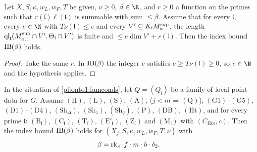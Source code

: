 \begin{lemma}\label{pf:onto1:concl_of_nat}
Let $X,S,\kappa,w_L,w_F,T$ be given, $\nu\ge0$, $\beta\in\R$, and $r\ge0$ a function on the primes such that
$r(\mathfrak l)\ell(\mathfrak l)$ is summable with sum $\le\beta$. Assume that for every $\mathfrak l$, every $e\in\N$ with
$T\nu(\mathfrak l)\le e$ and every $V'\subseteq K_{\mathfrak l}M^{\mathrm{sup}}_\kappa$, the length
$\operatorname{ql}_{\mathfrak l}(M^{\mathrm{sup}}_{\kappa,\mathfrak l}\cap V',\Theta_{\mathfrak l}\cap V')$ is finite and $\le e\dim V'+r(\mathfrak
l)$. Then the index bound $\mathrm{IB}(\beta)$ holds.
\end{lemma}

\begin{proof}
Take the same $r$. In $\mathrm{IB}(\beta)$ the integer $e$ satisfies $e\ge T\nu(\mathfrak l)\ge0$, so $e\in\N$ and the
hypothesis applies.
\end{proof}

\begin{theorem}\label{pf:onto1:thmzero}
In the situation of \cref{pf:onto1:famconds}, let $Q=(Q_{\mathfrak l})$ be a family of local point data for $G$. Assume
$(\mathrm H)$, $(\mathrm L)$, $(\mathrm S)$, $(\mathrm A)$, ($j<m\Rightarrow(\mathrm Q)$), $(\mathrm G1)$--$(\mathrm G5)$, $(\mathrm
D1)$--$(\mathrm D4)$, $(\mathrm{Sh}_\Delta)$, $(\mathrm{Sh}_z)$, $(\mathrm{Sh}_q)$, $(\mathrm P)$, $(\mathrm{DB})$, $(\mathrm{Ht})$, and
for every prime $\mathfrak l$: $(\mathrm B_{\mathfrak l})$, $(\mathrm C_{\mathfrak l})$, $(\mathrm T_{\mathfrak l})$, $(\mathrm E'_{\mathfrak
l})$, $(\mathrm Z_{\mathfrak l})$ and $(\mathrm M_{\mathfrak l})$ with $(C_{Rm},c)$. Then the index bound $\mathrm{IB}(\beta)$ holds
for $(X_j,S,\kappa,w_L,w_F,T,\nu)$ with
\[
\beta=\operatorname{rk}_\kappa\cdot f\cdot m\cdot b\cdot\delta_2 .
\]
\end{theorem}

